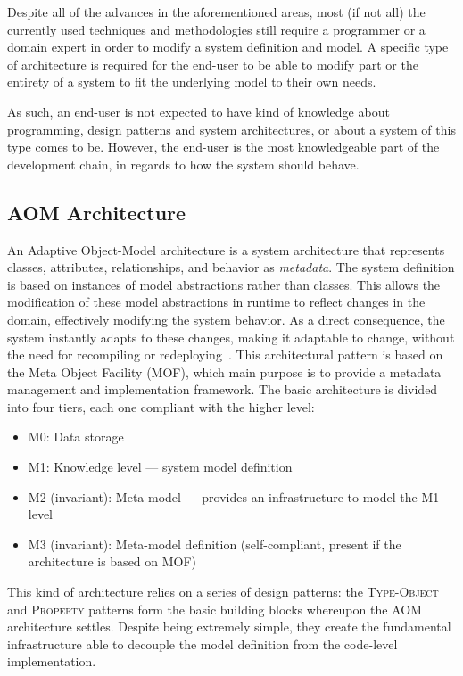 Despite all of the advances in the aforementioned areas, most (if not all) the currently used techniques and methodologies still require a programmer or a domain expert in order to modify a system definition and model. A specific type of architecture is required for the end-user to be able to modify part or the entirety of a system to fit the underlying model to their own needs.

As such, an end-user is not expected to have kind of knowledge about programming, design patterns and system architectures, or about a system of this type comes to be. However, the end-user is the most knowledgeable part of the development chain, in regards to how the system should behave.

\subsection{AOM Architecture}\label{sec:aom_architecture}

An Adaptive Object-Model architecture is a system architecture that represents classes, attributes, relationships, and behavior as \emph{metadata}. The system definition is based on instances of model abstractions rather than classes. This allows the modification of these model abstractions in runtime to reflect changes in the domain, effectively modifying the system behavior. As a direct consequence, the system instantly adapts to these changes, making it adaptable to change, without the need for recompiling or redeploying~\cite{YBJ01}. This architectural pattern is based on the Meta Object Facility (MOF), which main purpose is to provide a metadata management and implementation framework. The basic architecture is divided into four tiers, each one compliant with the higher level:~\cite{mof}

\begin{itemize}
  \item M0: Data storage
  \item M1: Knowledge level --- system model definition
  \item M2 (invariant): Meta-model --- provides an infrastructure to model the M1 level
  \item M3 (invariant): Meta-model definition (self-compliant, present if the architecture is based on MOF)
\end{itemize}

This kind of architecture relies on a series of design patterns: the \textsc{Type-Object} and \textsc{Property} patterns form the basic building blocks whereupon the AOM architecture settles. Despite being extremely simple, they create the fundamental infrastructure able to decouple the model definition from the code-level implementation.

